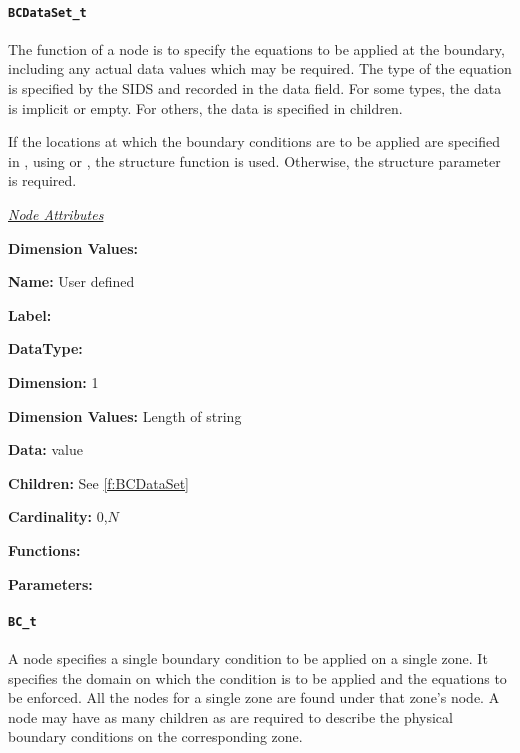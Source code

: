 \paragraph{\texttt{BCDataSet\_t}}

The function of a  node is to specify the equations
to be applied at the boundary, including any actual data values which
may be required. The type of the equation is specified by the SIDS and
recorded in the data field. For some types, the data is implicit or
empty. For others, the data is specified in  children.

If the locations at which the boundary conditions are to be applied
are specified in , using  or
, the structure function  is used.
Otherwise, the structure parameter  is required.

\textit{\uline{Node Attributes}}
\begin{Ventryic}{\textbf{Dimension Values:}}
\item [\textbf{Name:}]
      User defined
\item [\textbf{Label:}]
\item [\textbf{DataType:}]
\item [\textbf{Dimension:}]
      1
\item [\textbf{Dimension Values:}]
      Length of string
\item [\textbf{Data:}]
       value
\item [\textbf{Children:}]
      See \autoref{f:BCDataSet}
\item [\textbf{Cardinality:}]
      0,$N$
\item [\textbf{Functions:}]
\item [\textbf{Parameters:}]
\end{Ventryic}

\paragraph{\texttt{BC\_t}}

A  node specifies a single boundary condition to be applied
on a single zone. It specifies the domain on which the condition is
to be applied and the equations to be enforced. All the 
nodes for a single zone are found under that zone's 
node. A  node may have as many  children
as are required to describe the physical boundary conditions on the
corresponding zone.

